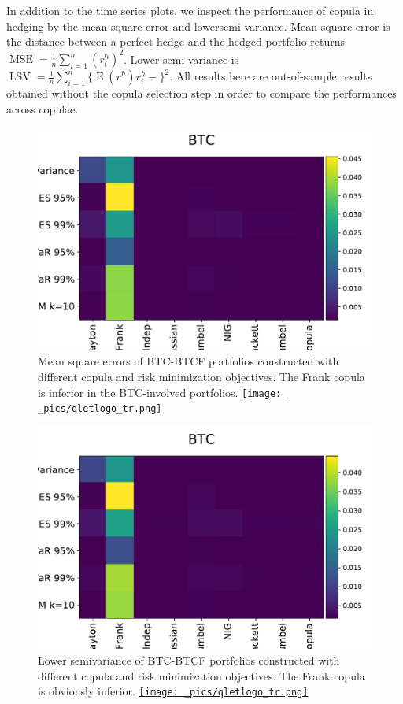In addition to the time series plots,
we inspect the performance of copula in hedging by the mean square error and lowersemi variance.
Mean square error is the distance between a perfect hedge and the hedged portfolio returns $\operatorname{MSE}=\frac{1}{n}\sum_{i=1}^n(r^h_i)^2$.
Lower semi variance is $\operatorname{LSV}=\frac{1}{n}\sum_{i=1}^n\{\operatorname{E}(r^h)r^h_i-\}^2$.
All results here are out-of-sample results obtained without the copula selection step in order to compare the performances across copulae.  \medskip

\begin{figure}[ht]
    \centering
    \includegraphics[width=\textwidth]{_pics/MSE_BTC.pdf}
  \caption{Mean square errors of BTC-BTCF portfolios constructed with different copula and risk minimization objectives.
    The Frank copula is inferior in the BTC-involved portfolios.
    \href{http://www.quantlet.com/}{\texttt{[image: \_pics/qletlogo\_tr.png]}} }
\label{fig:MSE_BTC}
\end{figure}

\begin{figure}[ht]
    \centering
    \includegraphics[width=\textwidth]{_pics/semiLowerVariance_BTC.pdf}
  \caption{Lower semivariance of BTC-BTCF portfolios constructed with different copula and risk minimization objectives.
  The Frank copula is obviously inferior.
  \href{http://www.quantlet.com/}{\texttt{[image: \_pics/qletlogo\_tr.png]}} }
\label{fig:SLV_BTC}
\end{figure}

